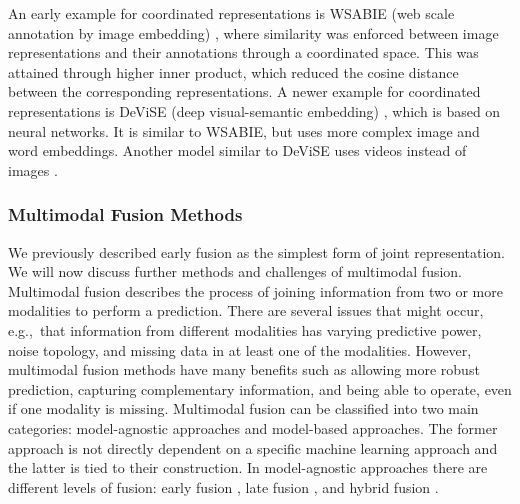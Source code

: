 \documentclass{article}
\begin{document}
An early example for coordinated representations is WSABIE (web scale annotation by image embedding) \citep{weston2011wsabie}, where similarity was enforced between image representations and their annotations through a coordinated space. This was attained through higher inner product, which reduced the cosine distance between the corresponding representations. A newer example for coordinated representations is DeViSE (deep visual-semantic embedding) \citep{frome2013devise}, which is based on neural networks. It is similar to WSABIE, but uses more complex image and word embeddings. Another model similar to DeViSE uses videos instead of images \citep{pan2016joint}.

\subsubsection{Multimodal Fusion Methods}

We previously described early fusion as the simplest form of joint representation. We will now discuss further methods and challenges of multimodal fusion. Multimodal fusion describes the process of joining information from two or more modalities to perform a prediction. There are several issues that might occur, e.g.,\ that information from different modalities has varying predictive power, noise topology, and missing data in at least one of the modalities. However, multimodal fusion methods have many benefits such as allowing more robust prediction, capturing complementary information, and being able to operate, even if one modality is missing. Multimodal fusion can be classified into two main categories: model-agnostic approaches and model-based approaches. The former approach is not directly dependent on a specific machine learning approach and the latter is tied to their construction. In model-agnostic approaches there are different levels of fusion: early fusion \citep{leong2011going, bruni2011distri}, late fusion \citep{gunes2005affect, snoek2005late}, and hybrid fusion \citep{atrey2010hybrid}.
\end{document}
